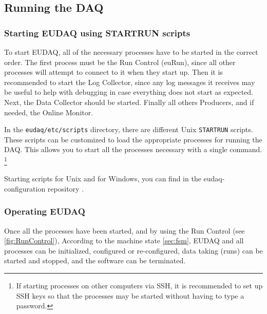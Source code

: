 \subsection{Running the DAQ}

\subsubsection{Starting EUDAQ using STARTRUN scripts}\label{sec:STARTRUN}
To start EUDAQ, all of the necessary processes have to be started in the correct order.
The first process must be the Run Control (euRun),
since all other processes will attempt to connect to it when they start up.
Then it is recommended to start the Log Collector,
since any log messages it receives may be useful
to help with debugging in case everything does not start as expected.
Next, the Data Collector should be started.
Finally all others Producers, and if needed, the Online Monitor.

In the \texttt{eudaq/etc/scripts} directory, there are different Unix \texttt{STARTRUN} scripts.
These scripts can be customized to load the appropriate processes for running the DAQ.
This allows you to start all the processes necessary with a single command.%
\footnote{If starting processes on other computers via SSH,
it is recommended to set up SSH keys so that the processes may be started without having to type a password.}

Starting scripts for Unix and for Windows, you can find in the eudaq-configuration repository \cite{githubEUDAQconfiguration}.

\subsubsection{Operating EUDAQ}
Once all the processes have been started, 
and by using the Run Control (see \autoref{fig:RunControl}),
According to the machine state \autoref{sec:fsm}, EUDAQ and all processes can be initialized, configured or re-configured, data taking (runs) can be started and stopped, and the software can be terminated.

